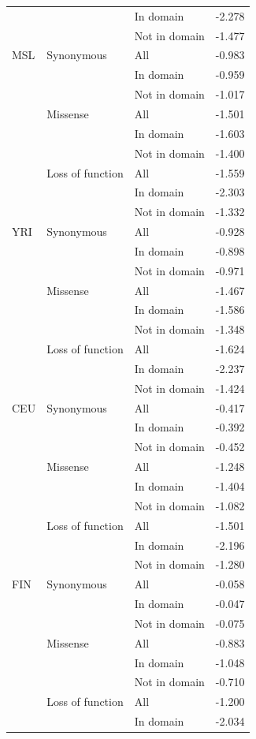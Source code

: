 \documentclass[]{article}
\begin{document}
\begin{longtable}[t]{lllr}
 &  & In domain & -2.278\\
 &  & Not in domain & -1.477\\
\addlinespace
MSL & Synonymous & All & -0.983\\
 &  & In domain & -0.959\\
 &  & Not in domain & -1.017\\
 & Missense & All & -1.501\\
 &  & In domain & -1.603\\
 &  & Not in domain & -1.400\\
 & Loss of function & All & -1.559\\
 &  & In domain & -2.303\\
 &  & Not in domain & -1.332\\
\addlinespace
YRI & Synonymous & All & -0.928\\
 &  & In domain & -0.898\\
 &  & Not in domain & -0.971\\
 & Missense & All & -1.467\\
 &  & In domain & -1.586\\
 &  & Not in domain & -1.348\\
 & Loss of function & All & -1.624\\
 &  & In domain & -2.237\\
 &  & Not in domain & -1.424\\
\addlinespace
CEU & Synonymous & All & -0.417\\
 &  & In domain & -0.392\\
 &  & Not in domain & -0.452\\
 & Missense & All & -1.248\\
 &  & In domain & -1.404\\
 &  & Not in domain & -1.082\\
 & Loss of function & All & -1.501\\
 &  & In domain & -2.196\\
 &  & Not in domain & -1.280\\
\addlinespace
FIN & Synonymous & All & -0.058\\
 &  & In domain & -0.047\\
 &  & Not in domain & -0.075\\
 & Missense & All & -0.883\\
 &  & In domain & -1.048\\
 &  & Not in domain & -0.710\\
 & Loss of function & All & -1.200\\
 &  & In domain & -2.034\\

\end{longtable}
\end{document}
